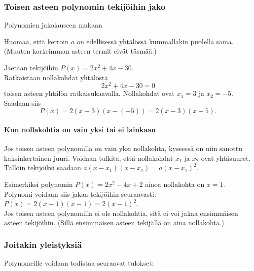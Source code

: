 \subsubsection*{Toisen asteen polynomin tekijöihin jako}

Polynomien jakolauseen mukaan

Huomaa, että kerroin $a$ on edellisessä yhtälössä kummallakin puolella sama.
(Muuten korkeimman asteen termit eivät täsmää.)

\begin{esimerkki}
Jaetaan tekijöihin $P(x)=2x^2 + 4x-30$. \\
Ratkaistaan nollakohdat yhtälöstä $$2x^2 + 4x-30=0$$ toisen asteen yhtälön ratkaisukaavalla.
Nollakohdat ovat $x_1=3$ ja $x_2=-5$. Saadaan siis
$$P(x)= 2(x-3)(x-(-5)) = 2(x-3)(x+5).$$
\end{esimerkki}

\paragraph*{Kun nollakohtia on vain yksi tai ei lainkaan}
Jos toisen asteen polynomilla on vain yksi nollakohta, kyseessä on niin sanottu kaksinkertainen juuri. Voidaan tulkita, että nollakohdat $x_1$ ja $x_2$ ovat yhtäsuuret. Tällöin tekijöiksi saadaan $a(x-x_1)(x-x_1)=a(x-x_1)^2$.

Esimerkiksi polynomin $P(x)=2x^2-4x+2$ ainoa nollakohta on $x=1$. Polynomi voidaan siis jakaa tekijöihin seuraavasti: \\ $P(x)=2(x-1)(x-1)=2(x-1)^2$. \\

Jos toisen asteen polynomilla ei ole nollakohtia, sitä ei voi jakaa ensimmäisen asteen tekijöihin. (Sillä ensimmäisen asteen tekijällä on aina nollakohta.)

\subsubsection*{Joitakin yleistyksiä}

Polynomeille voidaan todistaa seuraavat tulokset:


